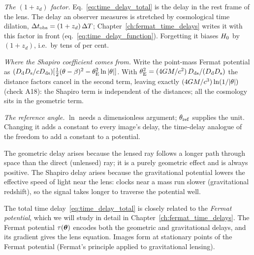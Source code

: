 \begin{annotation}
\textit{The $(1+z_d)$ factor.}  Eq.~\eqref{eq:time_delay_total} is the delay in
the rest frame of the lens.  The delay an observer measures is stretched by
cosmological time dilation, $\Delta t_{\rm obs} = (1+z_d)\,\Delta T$; Chapter~\ref{ch:fermat_time_delays}
writes it with this factor in front (eq.~\eqref{eq:time_delay_function}).
Forgetting it biases $H_0$ by $(1+z_d)$, i.e.\ by tens of per cent.

\textit{Where the Shapiro coefficient comes from.}  Write the point-mass Fermat
potential as $(D_{\mathrm{d}}D_{\mathrm{s}}/cD_{\mathrm{ds}})[\tfrac12(\theta-\beta)^2 -
\theta_{\mathrm{E}}^2\ln|\theta|]$.  With $\theta_{\mathrm{E}}^2 = (4G M/c^2)\,D_{\mathrm{ds}}/(D_{\mathrm{d}}D_{\mathrm{s}})$
the distance factors cancel in the second term, leaving exactly
$(4G M/c^3)\ln(1/|\theta|)$ (check A18): the Shapiro term
is independent of the distances; all the cosmology sits in the geometric term.

\textit{The reference angle.}  $\ln$ needs a dimensionless argument;
$\theta_{\rm ref}$ supplies the unit.  Changing it adds a constant to every image's
delay, the time-delay analogue of the freedom to add a constant to a potential.
\end{annotation}
\begin{remark}
The geometric delay arises because the lensed ray follows a longer path
through space than the direct (unlensed) ray; it is a purely geometric
effect and is always positive.  The Shapiro delay arises because the
gravitational potential lowers the effective speed of light near the lens:
clocks near a mass run slower (gravitational redshift), so the signal takes
longer to traverse the potential well.
\end{remark}

\begin{remark}
The total time delay~\eqref{eq:time_delay_total} is closely related to the
\emph{Fermat potential}, which we will study in detail in Chapter~\ref{ch:fermat_time_delays}.  The
Fermat potential $\tau(\boldsymbol{\theta})$ encodes both the geometric and
gravitational delays, and its gradient gives the lens equation.  Images
form at stationary points of the Fermat potential (Fermat's principle
applied to gravitational lensing).
\end{remark}

